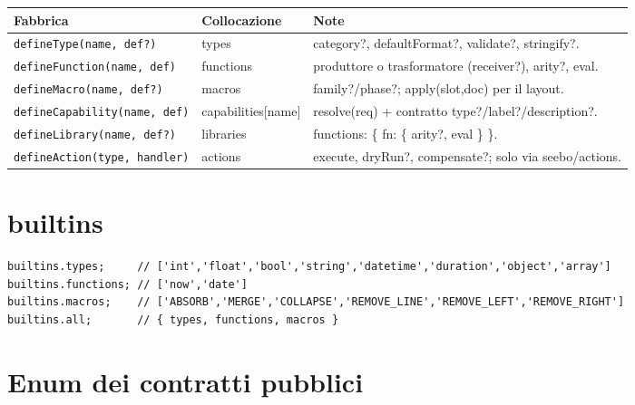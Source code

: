 \documentclass[11pt,a4paper]{book}
\let\code\lstinline
\newcommand{\ic}[1]{{\ttfamily #1}}
\theoremstyle{definition}
\begin{document}
{{{{\begin{center}
\small
\begin{tabular}{@{}l l p{6.4cm}@{}}
\toprule
\textbf{Fabbrica} & \textbf{Collocazione} & \textbf{Note} \\
\midrule
\code|defineType(name, def?)| & \ic{types} & \ic{category?}, \ic{defaultFormat?},
\ic{validate?}, \ic{stringify?}. \\
\code|defineFunction(name, def)| & \ic{functions} & produttore o trasformatore
(\ic{receiver?}), \ic{arity?}, \ic{eval}. \\
\code|defineMacro(name, def?)| & \ic{macros} & \ic{family?}/\ic{phase?};
\ic{apply(slot,doc)} per il layout. \\
\code|defineCapability(name, def)| & \ic{capabilities[name]} & \ic{resolve(req)} +
contratto \ic{type?}/\ic{label?}/\ic{description?}. \\
\code|defineLibrary(name, def?)| & \ic{libraries} & \ic{functions: \{ fn: \{ arity?, eval \} \}}. \\
\code|defineAction(type, handler)| & \ic{actions} & \ic{execute}, \ic{dryRun?},
\ic{compensate?}; solo via \ic{seebo/actions}. \\
\bottomrule
\end{tabular}
\end{center}

\section{builtins}

\begin{lstlisting}
builtins.types;     // ['int','float','bool','string','datetime','duration','object','array']
builtins.functions; // ['now','date']
builtins.macros;    // ['ABSORB','MERGE','COLLAPSE','REMOVE_LINE','REMOVE_LEFT','REMOVE_RIGHT']
builtins.all;       // { types, functions, macros }
\end{lstlisting}

\section{Enum dei contratti pubblici}

}}}}
\end{document}
